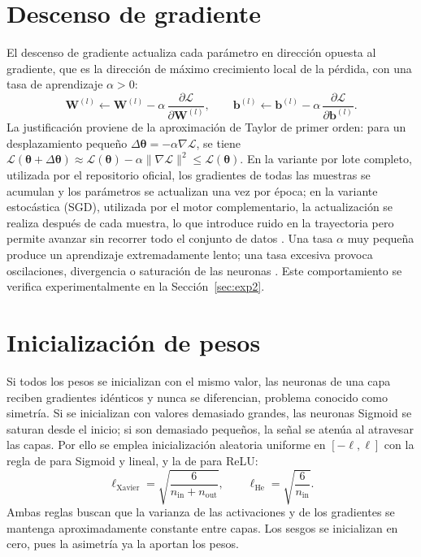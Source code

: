 \section{Descenso de gradiente}
El descenso de gradiente actualiza cada parámetro en dirección opuesta al gradiente, que es la dirección de máximo crecimiento local de la pérdida, con una tasa de aprendizaje $\alpha>0$:
\begin{equation}
\mathbf{W}^{(l)} \leftarrow \mathbf{W}^{(l)} - \alpha\,\frac{\partial\mathcal{L}}{\partial\mathbf{W}^{(l)}}, \qquad \mathbf{b}^{(l)} \leftarrow \mathbf{b}^{(l)} - \alpha\,\frac{\partial\mathcal{L}}{\partial\mathbf{b}^{(l)}}.\label{eq:gd}
\end{equation}
La justificación proviene de la aproximación de Taylor de primer orden: para un desplazamiento pequeño $\Delta\boldsymbol{\theta} = -\alpha\nabla\mathcal{L}$, se tiene $\mathcal{L}(\boldsymbol{\theta}+\Delta\boldsymbol{\theta}) \approx \mathcal{L}(\boldsymbol{\theta}) - \alpha\lVert\nabla\mathcal{L}\rVert^2 \le \mathcal{L}(\boldsymbol{\theta})$. En la variante por lote completo, utilizada por el repositorio oficial, los gradientes de todas las muestras se acumulan y los parámetros se actualizan una vez por época; en la variante estocástica (SGD), utilizada por el motor complementario, la actualización se realiza después de cada muestra, lo que introduce ruido en la trayectoria pero permite avanzar sin recorrer todo el conjunto de datos \citep{bottou2010}. Una tasa $\alpha$ muy pequeña produce un aprendizaje extremadamente lento; una tasa excesiva provoca oscilaciones, divergencia o saturación de las neuronas \citep{ruder2016}. Este comportamiento se verifica experimentalmente en la Sección~\ref{sec:exp2}.

\section{Inicialización de pesos}
Si todos los pesos se inicializan con el mismo valor, las neuronas de una capa reciben gradientes idénticos y nunca se diferencian, problema conocido como simetría. Si se inicializan con valores demasiado grandes, las neuronas Sigmoid se saturan desde el inicio; si son demasiado pequeños, la señal se atenúa al atravesar las capas. Por ello se emplea inicialización aleatoria uniforme en $[-\ell,\ell]$ con la regla de \citet{glorot2010} para Sigmoid y lineal, y la de \citet{he2015} para ReLU:
\begin{equation}
\ell_{\text{Xavier}} = \sqrt{\frac{6}{n_{\text{in}}+n_{\text{out}}}}, \qquad \ell_{\text{He}} = \sqrt{\frac{6}{n_{\text{in}}}}.\label{eq:init}
\end{equation}
Ambas reglas buscan que la varianza de las activaciones y de los gradientes se mantenga aproximadamente constante entre capas. Los sesgos se inicializan en cero, pues la asimetría ya la aportan los pesos.


